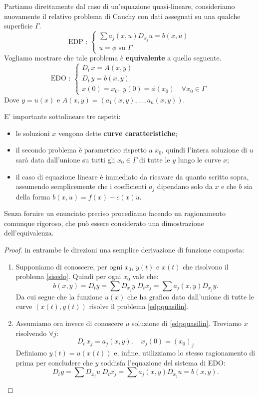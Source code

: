 Partiamo direttamente dal caso di un'equazione quasi-lineare, consideriamo nuovamente il relativo problema di Cauchy con dati assegnati su una qualche superficie $\Gamma$.
\begin{equation} \label{edpquasilin}
\text{EDP : }
\begin{cases}
\sum a_j(x,u)D_{x_j} u = b(x,u)\\
u = \phi \text{ su } \Gamma
\end{cases} 
\end{equation}
Vogliamo mostrare che tale problema è \textbf{equivalente} a quello seguente.
\begin{equation} \label{sisedo}
\text{EDO : }
\begin{cases}
D_t \, x = A(x,y) \; \\
D_t \, y = b(x,y)\\ 
x(0)=x_0, \; y(0) = \phi (x_0) \quad \forall x_0 \in \Gamma
\end{cases} 
\end{equation}
Dove $y = u(x)$ e $A(x,y)=(a_1(x,y),\ldots ,a_n(x,y))$.
\begin{remark}
E' importante sottolineare tre aspetti:
\begin{itemize}
\item le soluzioni $x$ vengono dette \textbf{curve caratteristiche};
\item il secondo problema è parametrico rispetto a $x_0$, quindi l'intera soluzione di $u$ sarà data dall'unione su tutti gli $x_0\in \Gamma$ di tutte le $y$ lungo le curve $x$;
\item il caso di equazione lineare è immediato da ricavare da quanto scritto sopra, assumendo semplicemente che i coefficienti $a_j$ dipendano solo da $x$ e che $b$ sia della forma $b(x,u)=f(x)-c(x)u$.
\end{itemize}
\end{remark}
Senza fornire un enunciato preciso procediamo facendo un ragionamento comunque rigoroso, che può essere considerato una dimostrazione dell'equivalenza.
\begin{proof}
in entrambe le direzioni una semplice derivazione di funzione composta:
\begin{enumerate}
\item Supponiamo di conoscere, per ogni $x_0$, $y(t)$ e $x(t)$ che risolvono il problema \eqref{sisedo}. Quindi per ogni $x_0$ vale che:
$$b(x,y) = D_t y = \sum D_{x_j} y \; D_t x_j = \sum a_j(x,y) D_{x_j} y.$$
Da cui segue che la funzione $u(x)$ che ha grafico dato dall'unione di tutte le curve $(x(t),y(t))$ risolve il problema \eqref{edpquasilin}.
\item Assumiamo ora invece di conoscere $u$ soluzione di \eqref{edpquasilin}. Troviamo $x$ risolvendo $\forall j$:
\begin{equation*} \label{sys}
D_t \, x_j = a_j(x,y), \quad x_j(0)=(x_0)_j 
\end{equation*}
Definiamo $y(t)=u(x(t))$ e, infine, utilizziamo lo stesso ragionamento di prima per concludere che $y$ soddisfa l'equazione del sistema di EDO:
$$D_t y = \sum D_{x_j} u \; D_t x_j = \sum  a_j(x,y)D_{x_j} u = b(x,y).$$
\qedhere
\end{enumerate}
\end{proof}
